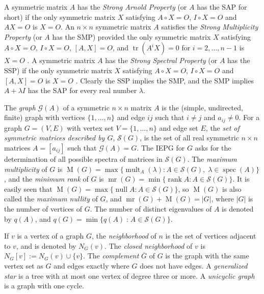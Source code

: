 \documentclass[11pt]{article}
\def\red{\color{red}}
\theoremstyle{definition}
\theoremstyle{definition}
\theoremstyle{definition}
\DeclareMathOperator{\tr}{tr}
\newcommand{\Gc}{\overline{G}}
\newcommand{\x}{\times}
\newcommand{\mptn}{\mathcal{S}} %
\newcommand{\G}{\mathcal{G}}
\DeclareMathOperator{\M}{M}
\begin{document}
A symmetric matrix $A$ has the {\it Strong Arnold Property} (or $A$ has the SAP for short)
if the only symmetric matrix $X$ satisfying $A\circ X=O$, $I\circ X=O$ and $AX=O$ is $X=O$.  
An $n \times n$ symmetric matrix $A$ satisfies the {\it Strong Multiplicity Property} (or $A$ has the SMP)
provided the only symmetric matrix $X$ satisfying $A\circ X=O$, $I\circ X=O$, $[A,X]=O$, and $\tr(A^iX)=0$ for $i=2,\ldots, n-1$ is $X=O$ \cite[Definition~18 and Remark~19]{genSAP}. 
A symmetric matrix $A$ has the {\it Strong Spectral Property} (or $A$ has the SSP)
if the only symmetric matrix $X$ satisfying $A\circ X=O$, $I\circ X=O$ and $[A,X]=O$ is $X=O$ \cite[Definition~8]{genSAP}.  Clearly the SSP implies the SMP, and the SMP implies $A+\lambda I$ has the SAP for every real number $\lambda$.

The {\em graph} $\G(A)$ of a symmetric $n\x n$ matrix $A$ is the (simple, undirected, finite) graph with vertices $\{1,\dots,n\}$ and edge $ij$ such that $i\ne j$ and $a_{ij} \neq 0$.   For a  graph $G=(V,E)$ with  vertex set $V=\{1,\dots,n\}$ and edge set $E$, 
the {\em set of symmetric matrices described by $G$}, $\mathcal{S}(G)$,  is the set of all real symmetric $n \times n$ matrices $A=[a_{ij}]$  such that  $\G(A)=G$.  The IEPG for $G$ asks for the determination of all possible spectra of matrices in $\mathcal{S}(G)$.
The  {\em maximum multiplicity}  of $G$ is
$\M(G) = \max\{\operatorname{mult}_A (\lambda) :  A 
\in \mathcal{S}(G),\;\lambda\in \operatorname{spec}(A)\}$,  and the {\em minimum rank} of $G$ is 
$\operatorname{mr}(G) = \min\{\operatorname{rank } A :  A \in \mathcal{S}(G)\}$.  It is easily seen that $\M(G)=\max\{\operatorname{null } A :  A 
\in \mathcal{S}(G)\}$, so $\M(G)$ is also called the {\em maximum nullity} of $G$, and $\operatorname{mr}(G)+\M(G)=|G|$, where $|G|$ is the number of vertices of $G$. The number of distinct eigenvalues of $A$ is denoted by $q(A)$, and   $q(G) = \min\{q(A)\; \mbox{:}\; A \in \mptn(G)\}$.

If $v$ is a vertex of a graph $G$, the {\em neighborhood} of $n$ is the set of vertices adjacent to $v$, and is denoted by $N_G(v)$. %
The {\em closed neighborhood} of $v$ is $N_G[v]:=N_G(v)\cup \{v\}$.   The {\em complement} $\overline{G}$ of $G$ is the graph with the same vertex set as $G$ and edges exactly where $G$ does not have edges.  A {\em generalized  star} is a tree with at most one vertex of degree three or more.  A {\em unicyclic graph} is a graph with one cycle.
\end{document}
